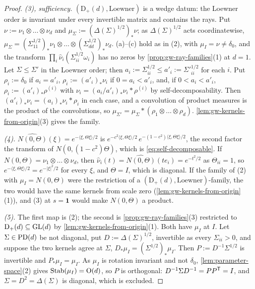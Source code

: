 \begin{proof}
\emph{(3), sufficiency.} $(\mathrm D_+(d), \text{Loewner})$ is a wedge datum: the Loewner order is
invariant under every invertible matrix and contains the rays. Put $\nu := \nu_1 \otimes \dots \otimes \nu_d$ and $\mu_\Sigma :=
(\Delta(\Sigma)^{1/2})_*\nu$; as $\Delta(\Sigma)^{1/2}$ acts coordinatewise,
$\mu_\Sigma = (\Sigma_{11}^{1/2})_*\nu_1 \otimes \dots \otimes (\Sigma_{dd}^{1/2})_*\nu_d$. (a)--(c) hold as in
(2), with $\mu_I = \nu \ne \delta_0$, and the transform $\prod_i\widehat\nu_i(\Sigma_{ii}^{1/2}\omega_i)$ has
no zeros by \ref{prop:gw-ray-families}(1) at $d = 1$. Let $\Sigma \le \Sigma'$ in the Loewner order; then
$a_i := \Sigma_{ii}^{1/2} \le a'_i := \Sigma'^{1/2}_{ii}$ for each $i$. Put $\rho_i := \delta_0$ if
$a_i = a'_i$, $\rho_i := (a'_i)_*\nu_i$ if $0 = a_i < a'_i$, and, if $0 < a_i < a'_i$,
$\rho_i := (a'_i)_*\rho^{(i)}$ with $\nu_i = (a_i/a'_i)_*\nu_i * \rho^{(i)}$ by self-decomposability. Then
$(a'_i)_*\nu_i = (a_i)_*\nu_i * \rho_i$ in each case, and a convolution of product measures is the product of
the convolutions, so $\mu_{\Sigma'} = \mu_\Sigma * (\rho_1 \otimes \dots \otimes \rho_d)$.
\ref{lem:gw-kernels-from-origin}(3) gives the family.

\emph{(4).} $\widehat{N(0,\Theta)}(\xi) = e^{-\langle\xi,\Theta\xi\rangle/2}$ is
$e^{-c^2\langle\xi,\Theta\xi\rangle/2}\,e^{-(1-c^2)\langle\xi,\Theta\xi\rangle/2}$, the second factor the transform of
$N(0,(1-c^2)\Theta)$, which is \ref{eq:self-decomposable}. If $N(0,\Theta) = \nu_1 \otimes \dots \otimes \nu_d$, then
$\widehat\nu_i(t) = \widehat{N(0,\Theta)}(te_i) = e^{-t^2/2}$ as $\Theta_{ii} = 1$, so
$e^{-\langle\xi,\Theta\xi\rangle/2} = e^{-|\xi|^2/2}$ for every $\xi$, and $\Theta = I$, which is diagonal. If the
family of (2) with $\mu_I = N(0,\Theta)$ were the restriction of a $(\mathrm D_+(d), \text{Loewner})$-family, the
two would have the same kernels from scale zero (\ref{lem:gw-kernels-from-origin}(1)), and (3) at $s =
\mathbf 1$ would make $N(0,\Theta)$ a product.

\emph{(5).} The first map is (2); the second is \ref{prop:gw-ray-families}(3) restricted to
$\mathrm D_+(d) \subseteq \mathrm{GL}(d)$ by \ref{lem:gw-kernels-from-origin}(1). Both have $\mu_I$ at $I$. Let
$\Sigma \in \mathrm{PD}(d)$ be not diagonal, put $D := \Delta(\Sigma)^{1/2}$, invertible as every $\Sigma_{ii} > 0$,
and suppose the two kernels agree at $\Sigma$, $D_*\mu_I = (\Sigma^{1/2})_*\mu_I$. Then
$P := D^{-1}\Sigma^{1/2}$ is invertible and $P_*\mu_I = \mu_I$. As $\mu_I$ is rotation invariant and not
$\delta_0$, \ref{lem:parameter-space}(2) gives $\operatorname{Stab}(\mu_I) = \mathrm{O}(d)$, so $P$ is orthogonal: $D^{-1}\Sigma D^{-1} = PP^{\mathsf{T}} = I$, and
$\Sigma = D^2 = \Delta(\Sigma)$ is diagonal, which is excluded.
\end{proof}

